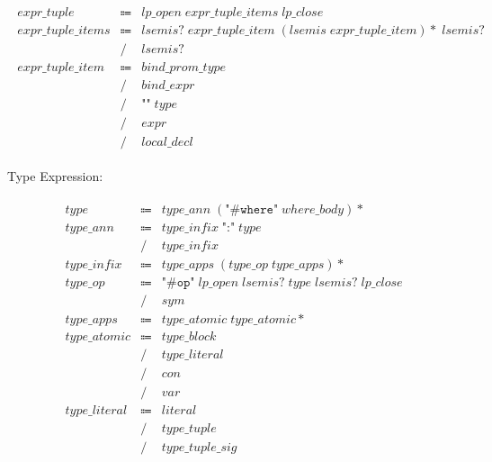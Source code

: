 \begin{align*}
    \begin{array}{rcll}
        \mathit{expr\_tuple}
        &\Coloneq &\mathit{lp\_open}\; \mathit{expr\_tuple\_items}\; \mathit{lp\_close} \\
        \mathit{expr\_tuple\_items}
        &\Coloneq &\mathit{lsemis}{?}\; \mathit{expr\_tuple\_item}\; (\mathit{lsemis}\; \mathit{expr\_tuple\_item}){*}\; \mathit{lsemis}{?} \\
        &\mathrel{/} &\mathit{lsemis}{?} \\
        \mathit{expr\_tuple\_item}
        &\Coloneq &\mathit{bind\_prom\_type} \\
        &\mathrel{/} &\mathit{bind\_expr} \\
        &\mathrel{/} &\texttt{"\^{}"}\; \mathit{type} \\
        &\mathrel{/} &\mathit{expr} \\
        &\mathrel{/} &\mathit{local\_decl}
    \end{array}
\end{align*}

Type Expression:

\begin{align*}
    \begin{array}{rcll}
        \mathit{type}
        &\Coloneq &\mathit{type\_ann}\; (\texttt{"\#where"}\; \mathit{where\_body}){*} \\
        \mathit{type\_ann}
        &\Coloneq &\mathit{type\_infix}\; \texttt{":"}\; \mathit{type} \\
        &\mathrel{/} &\mathit{type\_infix} \\
        \mathit{type\_infix}
        &\Coloneq &\mathit{type\_apps}\; (\mathit{type\_op}\; \mathit{type\_apps}){*} \\
        \mathit{type\_op}
        &\Coloneq &\texttt{"\#op"}\; \mathit{lp\_open}\; \mathit{lsemis}{?}\; \mathit{type}\; \mathit{lsemis}{?}\; \mathit{lp\_close} \\
        &\mathrel{/} &\mathit{sym} \\
        \mathit{type\_apps}
        &\Coloneq &\mathit{type\_atomic}\; \mathit{type\_atomic}{*} \\
        \mathit{type\_atomic}
        &\Coloneq &\mathit{type\_block} \\
        &\mathrel{/} &\mathit{type\_literal} \\
        &\mathrel{/} &\mathit{con} \\
        &\mathrel{/} &\mathit{var} \\
        \mathit{type\_literal}
        &\Coloneq &\mathit{literal} \\
        &\mathrel{/} &\mathit{type\_tuple} \\
        &\mathrel{/} &\mathit{type\_tuple\_sig}
    \end{array}
\end{align*}

